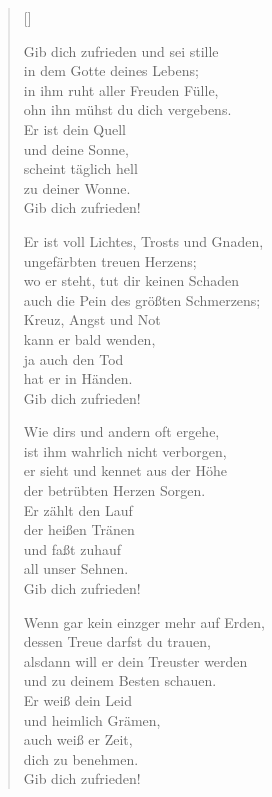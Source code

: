 \begin{multicols}{2}
\settowidth{\versewidth}{Er ist voll Lichtes, Trosts und Gnaden,}
\begin{verse}[\versewidth]

 Gib dich zufrieden und sei stille\\
in dem Gotte deines Lebens;\\
in ihm ruht aller Freuden Fülle,\\
ohn ihn mühst du dich vergebens.\\
Er ist dein Quell\\
und deine Sonne,\\
scheint täglich hell\\
zu deiner Wonne.\\
Gib dich zufrieden!

 Er ist voll Lichtes, Trosts und Gnaden,\\
ungefärbten treuen Herzens;\\
wo er steht, tut dir keinen Schaden\\
auch die Pein des größten Schmerzens;\\
Kreuz, Angst und Not\\
kann er bald wenden,\\
ja auch den Tod\\
hat er in Händen.\\
Gib dich zufrieden!

 Wie dirs und andern oft ergehe,\\
ist ihm wahrlich nicht verborgen,\\
er sieht und kennet aus der Höhe\\
der betrübten Herzen Sorgen.\\
Er zählt den Lauf\\
der heißen Tränen\\
und faßt zuhauf\\
all unser Sehnen.\\
Gib dich zufrieden!

 Wenn gar kein einzger mehr auf Erden,\\
dessen Treue darfst du trauen,\\
alsdann will er dein Treuster werden\\
und zu deinem Besten schauen.\\
Er weiß dein Leid\\
und heimlich Grämen,\\
auch weiß er Zeit,\\
dich zu benehmen.\\
Gib dich zufrieden!


\end{verse}
\end{multicols}
